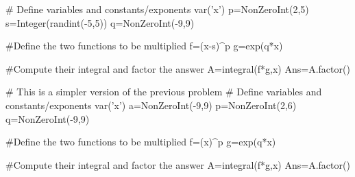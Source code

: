 







\begin{sagesilent}
# Define variables and constants/exponents
var('x')
p=NonZeroInt(2,5)
s=Integer(randint(-5,5))
q=NonZeroInt(-9,9)

#Define the two functions to be multiplied
f=(x-s)^p
g=exp(q*x)

#Compute their integral and factor the answer
A=integral(f*g,x)
Ans=A.factor()
\end{sagesilent}



\begin{sagesilent}
# This is a simpler version of the previous problem
# Define variables and constants/exponents
var('x')
a=NonZeroInt(-9,9)
p=NonZeroInt(2,6)
q=NonZeroInt(-9,9)

#Define the two functions to be multiplied
f=(x)^p
g=exp(q*x)

#Compute their integral and factor the answer
A=integral(f*g,x)
Ans=A.factor()
\end{sagesilent}



